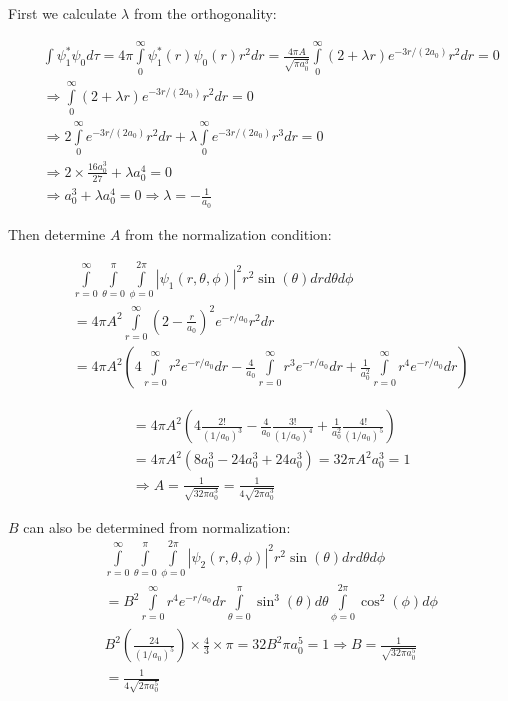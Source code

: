 \begin{enumerate}
First we calculate $\lambda$ from the orthogonality:

\begin{eqnarray}
\nonumber
& & \int\psi_1^*\psi_0 d\tau = 4\pi\int\limits_{0}^\infty\psi^*_1(r)\psi_0(r)r^2dr = \frac{4\pi A}{\sqrt{\pi a_0^3}}\int\limits_{0}^\infty (2 + \lambda r)e^{-3r/(2a_0)} r^2dr = 0\\
\nonumber
& & \Rightarrow \int\limits_{0}^\infty(2 + \lambda r)e^{-3r/(2a_0)}r^2dr = 0\\
\nonumber
& & \Rightarrow 2\int\limits_{0}^{\infty}e^{-3r/(2a_0)}r^2dr + \lambda\int\limits_{0}^{\infty}e^{-3r/(2a_0)}r^3dr = 0\\
\nonumber
& & \Rightarrow 2\times\frac{16a_0^3}{27} + \lambda a_0^4 = 0\\
\nonumber
& & \Rightarrow a_0^3 + \lambda a_0^4 = 0 \Rightarrow \lambda = -\frac{1}{a_0}
\end{eqnarray}

Then determine $A$ from the normalization condition:

\begin{eqnarray}
\nonumber
& & \int\limits_{r=0}^{\infty}\int\limits_{\theta = 0}^{\pi}\int\limits_{\phi = 0}^{2\pi}\left|\psi_1(r,\theta,\phi)\right|^2 r^2 \sin(\theta) drd\theta d\phi\\
\nonumber
& & = 4\pi A^2\int\limits_{r=0}^{\infty}\left(2 - \frac{r}{a_0}\right)^2e^{-r/a_0}r^2dr\\
\nonumber
& & = 4\pi A^2\left(4\int\limits_{r=0}^{\infty} r^2e^{-r/a_0}dr - \frac{4}{a_0}\int\limits_{r=0}^{\infty} r^3e^{-r/a_0}dr + \frac{1}{a_0^2}\int\limits_{r=0}^{\infty} r^4 e^{-r/a_0}dr\right)
\end{eqnarray}

\begin{eqnarray}
\nonumber
& & = 4\pi A^2\left(4\frac{2!}{(1/a_0)^3} - \frac{4}{a_0}\frac{3!}{(1/a_0)^4} + \frac{1}{a_0^2}\frac{4!}{(1/a_0)^5}\right)\\
\nonumber
& & = 4\pi A^2\left(8a_0^3 - 24a_0^3 + 24a_0^3\right) = 32\pi A^2 a_0^3 = 1\\
\nonumber
& & \Rightarrow A = \frac{1}{\sqrt{32\pi a_0^3}} = \frac{1}{4\sqrt{2\pi a_0^3}}
\end{eqnarray}

$B$ can also be determined from normalization:
\begin{eqnarray}
\nonumber
& & \int\limits_{r=0}^{\infty}\int\limits_{\theta = 0}^{\pi}\int\limits_{\phi = 0}^{2\pi}\left|\psi_2(r,\theta,\phi)\right|^2 r^2 \sin(\theta) drd\theta d\phi\\
\nonumber
& & = B^2\int\limits_{r = 0}^{\infty}r^4e^{-r/a_0}dr\int\limits_{\theta = 0}^{\pi}\sin^3(\theta)d\theta\int\limits_{\phi = 0}^{2\pi}\cos^2(\phi)d\phi\\
\nonumber
& & B^2\left(\frac{24}{(1/a_0)^5}\right)\times\frac{4}{3}\times\pi = 32B^2\pi a_0^5 = 1 \Rightarrow B = \frac{1}{\sqrt{32\pi a_0^5}}\\
\nonumber
& & = \frac{1}{4\sqrt{2\pi a_0^5}}
\end{eqnarray}


\end{enumerate}
